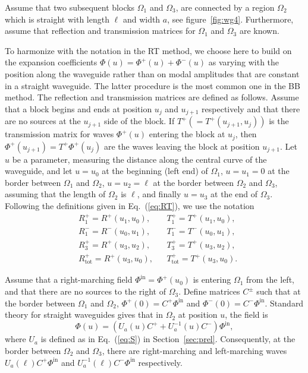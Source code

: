 \documentclass[numreferences]{kluwer}
\renewcommand{\Phi}{\varPhi}
\renewcommand{\vec}[1]{\bm{#1}}
\renewcommand{\Phi}{\varPhi}
\newcommand{\Phiin}{\vec\Phi^{\text{in}}}
\newcommand{\Ttot}{T^+_{\text{tot}}}
\newcommand{\Rtot}{R^+_{\text{tot}}}
\begin{document}
Assume that two subsequent blocks $\Omega_1$ and $\Omega_3$, are
connected by a region $\Omega_2$ which is straight with length $\ell$
and width $a$, see figure~\ref{fig:wg4}.  Furthermore, assume that
reflection and transmission matrices for $\Omega_1$ and $\Omega_3$ are
known.

To harmonize with the notation in the RT method, we choose here to
build on the expansion coefficients
$\vec\Phi(u)=\vec\Phi^+(u)+\vec\Phi^-(u)$ as varying with the position
along the waveguide rather than on modal amplitudes that are constant
in a straight waveguide. The latter procedure is the most common one
in the BB method. The reflection and transmission matrices are defined as
follows. Assume that a block begins and ends at position $u_j$ and
$u_{j+1}$ respectively and that there are no sources at the $u_{j+1}$
side of the block. If $T^+(=T^+(u_{j+1},u_j))$ is the transmission
matrix for waves $\vec\Phi^+(u)$ entering the block at $u_{j}$, then
$\vec\Phi^+(u_{j+1})=T^+\vec\Phi^+(u_{j})$ are the waves leaving the
block at position $u_{j+1}$. Let $u$ be a parameter, measuring the
distance along the central curve of the waveguide, and let $u=u_0$ at
the beginning (left end) of $\Omega_1$, $u=u_1=0$ at the border
between $\Omega_1$ and $\Omega_2$, $u=u_2=\ell$ at the border between
$\Omega_2$ and $\Omega_3$, assuming that the length of $\Omega_2$ is
$\ell$, and finally $u=u_3$ at the end of $\Omega_3$. Following the
definitions given in Eq.~(\ref{eq:RT}), we use the notation
\begin{align*}
  &R^+_1=R^+(u_1,u_0),&&T^+_1=T^+(u_1,u_0),\\
  &R^-_1=R^-(u_0,u_1),&&T^-_1=T^-(u_0,u_1),\\
  &R^+_3=R^+(u_3,u_2),&&T^+_3=T^+(u_3,u_2),\\
  &\Rtot=R^+(u_3,u_0),&&\Ttot=T^+(u_3,u_0).
\end{align*}

Assume that a right-marching field $\Phiin=\vec\Phi^+(u_0)$ is
entering $\Omega_1$ from the left, and that there are no sources to
the right of $\Omega_3$. Define matrices $C^\pm$ such that at the
border between $\Omega_1$ and $\Omega_2$, $\vec\Phi^+(0)=C^+\Phiin$
and $\vec\Phi^-(0)=C^-\Phiin$. Standard theory for straight waveguides
gives that in $\Omega_2$ at position $u$, the field is
\begin{equation}
  \label{eq:midfield}
  \vec\Phi(u)=(U_a(u)C^++U_a^{-1}(u)C^-)\Phiin,
\end{equation}
where $U_a$ is defined as in Eq.~(\ref{eq:S}) in
Section~\ref{sec:prel}.  Consequently, at the border between
$\Omega_2$ and $\Omega_3$, there are right-marching and left-marching
waves $U_a(\ell)C^+\Phiin$ and $U_a^{-1}(\ell)C^-\Phiin$ respectively.
\end{document}
